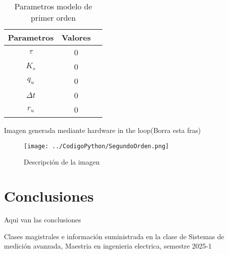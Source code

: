 \documentclass[conference]{IEEEtran}
\begin{document}
\begin{table}[h]
	\centering
	\caption{Parametros modelo de primer orden}
	\label{tab:parametros_primer_orden}
	\begin{tabular}{|c|c|c|}
		\hline
		\textbf{Parametros} & \textbf{Valores} \\
		\hline
		$\tau$  &  0 \\
		$K_s$      & 0 \\
		$q_u$ & 0 \\
		$\Delta t$ & 0\\  
		$r_u$ & 0 \\ 
		\hline
	\end{tabular}
	
\end{table}

Imagen generada mediante hardware in the loop(Borra esta fras)

\begin{figure}[h]
	\centering
	\texttt{[image: ../CodigoPython/SegundoOrden.png]}
	\caption{Descripción de la imagen}
	\label{fig:etiqueta}
\end{figure}




\section{Conclusiones}

Aqui van las conclusiones

\begin{thebibliography}{00}

	\item Clases magistrales e información suministrada en la clase de Sistemas de medición avanzada, Maestria en ingenieria electrica, semestre 2025-1

\end{thebibliography}
\end{document}
